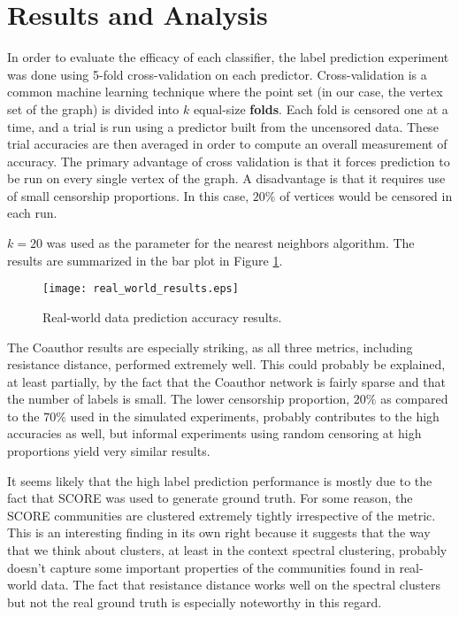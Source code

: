 \section{Results and Analysis}

In order to evaluate the efficacy of each classifier, the label prediction experiment was done using
5-fold cross-validation on each predictor. Cross-validation is a common machine learning technique
where the point set (in our case, the vertex set of the graph) is divided into $k$ equal-size
\textbf{folds}. Each fold is censored one at a time, and a trial is run using a predictor built from
the uncensored data. These trial accuracies are then averaged in order to compute an overall
measurement of accuracy. The primary advantage of cross validation is that it forces prediction to
be run on every single vertex of the graph. A disadvantage is that it requires use of small
censorship proportions. In this case, $20\%$ of vertices would be censored in each run.

$k=20$ was used as the parameter for the nearest neighbors algorithm. The results are summarized in
the bar plot in Figure \ref{fig:real_world_results}.

\begin{figure}[H]
  \centering
  \texttt{[image: real\_world\_results.eps]}
  \caption{Real-world data prediction accuracy results.}
  \label{fig:real_world_results}
\end{figure}

The Coauthor results are especially striking, as all three metrics, including resistance distance,
performed extremely well. This could probably be explained, at least partially, by the fact that the
Coauthor network is fairly sparse and that the number of labels is small. The lower censorship
proportion, $20\%$ as compared to the $70\%$ used in the simulated experiments, probably contributes
to the high accuracies as well, but informal experiments using random censoring at high proportions
yield very similar results.

It seems likely that the high label prediction performance is mostly due to the fact that SCORE was
used to generate ground truth. For some reason, the SCORE communities are clustered extremely
tightly irrespective of the metric. This is an interesting finding in its own right because it
suggests that the way that we think about clusters, at least in the context spectral clustering,
probably doesn't capture some important properties of the communities found in real-world data. The
fact that resistance distance works well on the spectral clusters but not the real ground truth is
especially noteworthy in this regard.

